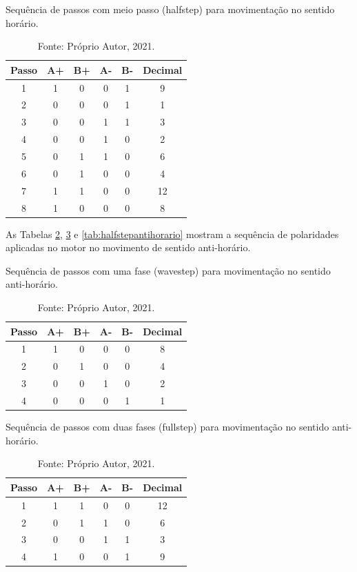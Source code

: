 \begin{table}
    \centering
    \caption{Sequência de passos com meio passo (halfstep) para movimentação no sentido horário.}
    \begin{tabular}{cccccc}
        \hline
        \textbf{Passo} & \textbf{A+} & \textbf{B+} & \textbf{A-} & \textbf{B-} & \textbf{Decimal}\\
        \hline
        1 & 1 & 0 & 0 & 1 & 9\\
        2 & 0 & 0 & 0 & 1 & 1\\
        3 & 0 & 0 & 1 & 1 & 3\\
        4 & 0 & 0 & 1 & 0 & 2\\
        5 & 0 & 1 & 1 & 0 & 6\\
        6 & 0 & 1 & 0 & 0 & 4\\
        7 & 1 & 1 & 0 & 0 & 12\\
        8 & 1 & 0 & 0 & 0 & 8\\
        \hline       
    \end{tabular}
    \caption*{Fonte: Próprio Autor, 2021.}
    \label{tab:halfstephorario}
\end{table}

As Tabelas \ref{tab:wavestepantihorario}, \ref{tab:fullstepantihorario} e \ref{tab:halfstepantihorario} 
mostram a sequência de polaridades aplicadas no motor no movimento de sentido anti-horário.

\begin{table}
    \centering
    \caption{Sequência de passos com uma fase (wavestep) para movimentação no sentido anti-horário.}
    \begin{tabular}{cccccc}
        \hline
        \textbf{Passo} & \textbf{A+} & \textbf{B+} & \textbf{A-} & \textbf{B-} & \textbf{Decimal}\\
        \hline
        1 & 1 & 0 & 0 & 0 & 8\\
        2 & 0 & 1 & 0 & 0 & 4\\
        3 & 0 & 0 & 1 & 0 & 2\\
        4 & 0 & 0 & 0 & 1 & 1\\
        \hline       
    \end{tabular}
    \caption*{Fonte: Próprio Autor, 2021.}
    \label{tab:wavestepantihorario}
\end{table}

\begin{table}
    \centering
    \caption{Sequência de passos com duas fases (fullstep) para movimentação no sentido anti-horário.}
    \begin{tabular}{cccccc}
        \hline
        \textbf{Passo} & \textbf{A+} & \textbf{B+} & \textbf{A-} & \textbf{B-} & \textbf{Decimal}\\
        \hline
        1 & 1 & 1 & 0 & 0 & 12\\
        2 & 0 & 1 & 1 & 0 & 6\\
        3 & 0 & 0 & 1 & 1 & 3\\
        4 & 1 & 0 & 0 & 1 & 9\\
        \hline       
    \end{tabular}
    \caption*{Fonte: Próprio Autor, 2021.}
    \label{tab:fullstepantihorario}
\end{table}

